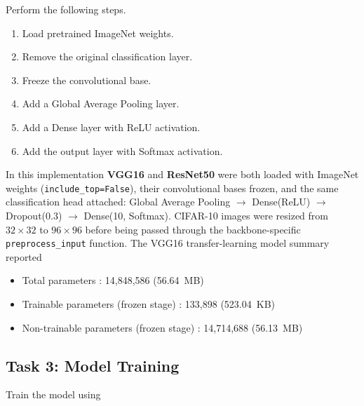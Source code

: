 \documentclass[11pt]{article}
\begin{document}
Perform the following steps.

\begin{enumerate}

\item Load pretrained ImageNet weights.

\item Remove the original classification layer.

\item Freeze the convolutional base.

\item Add a Global Average Pooling layer.

\item Add a Dense layer with ReLU activation.

\item Add the output layer with Softmax activation.

\end{enumerate}

In this implementation \textbf{VGG16} and \textbf{ResNet50} were both
loaded with ImageNet weights (\texttt{include\_top=False}), their
convolutional bases frozen, and the same classification head attached:
Global Average Pooling $\rightarrow$ Dense(ReLU) $\rightarrow$
Dropout(0.3) $\rightarrow$ Dense(10, Softmax). CIFAR-10 images were
resized from $32\times32$ to $96\times96$ before being passed through the
backbone-specific \texttt{preprocess\_input} function. The VGG16
transfer-learning model summary reported

\begin{itemize}
\item Total parameters : 14,848,586 (56.64\ MB)
\item Trainable parameters (frozen stage) : 133,898 (523.04\ KB)
\item Non-trainable parameters (frozen stage) : 14,714,688 (56.13\ MB)
\end{itemize}


\subsection*{Task 3: Model Training}

Train the model using
\end{document}
